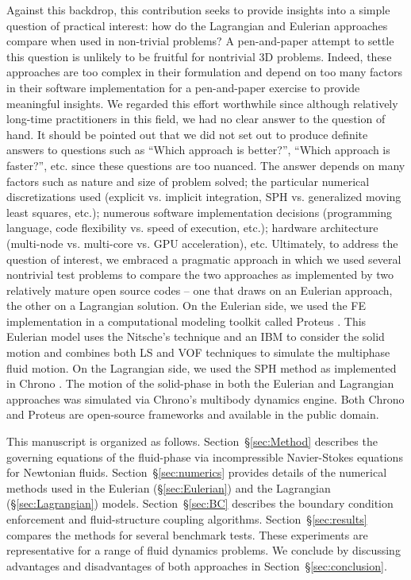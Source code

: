 \documentclass[final,3p,times]{elsarticle}
\begin{document}
Against this backdrop, this contribution seeks to provide insights into a simple question of practical interest: how do the Lagrangian and Eulerian approaches compare when used in non-trivial problems? A pen-and-paper attempt to settle this question is unlikely to be fruitful for nontrivial 3D problems. Indeed, these approaches are too complex in their formulation and depend on too many factors in their software implementation for a pen-and-paper exercise to provide meaningful insights. We regarded this effort worthwhile since although relatively long-time practitioners in this field, we had no clear answer to the question of hand. It should be pointed out that we did not set out to produce definite answers to questions such as ``Which approach is better?'', ``Which approach is faster?'', etc. since these questions are too nuanced. The answer depends on many factors such as nature and size of problem solved; the particular numerical discretizations used (explicit vs. implicit integration, SPH vs. generalized moving least squares, etc.); numerous software implementation decisions (programming language, code flexibility vs. speed of execution, etc.); hardware architecture (multi-node vs. multi-core vs. GPU acceleration), etc. Ultimately, to address the question of interest, we embraced a pragmatic approach in which we used several nontrivial test problems to compare the two approaches as implemented by two relatively mature open source codes -- one that draws on an Eulerian approach, the other on a Lagrangian solution. On the Eulerian side, we used the FE implementation in a computational modeling toolkit called Proteus \cite{proteus_1_6_1}. This Eulerian model uses the Nitsche's technique and an IBM to consider the solid motion and combines both LS and VOF techniques to simulate the multiphase fluid motion. On the Lagrangian side, we used the SPH method as implemented in Chrono \cite{projectChronoWebSite,chronoOverview2016}. 
The motion of the solid-phase in both the Eulerian and Lagrangian approaches was simulated via Chrono's multibody dynamics engine. Both Chrono and Proteus are open-source frameworks and available in the public domain.

This manuscript is organized as follows. Section~\S\ref{sec:Method} describes the governing equations of the fluid-phase via incompressible Navier-Stokes equations for Newtonian fluids. Section~\S\ref{sec:numerics} provides details of the numerical methods used in the Eulerian (\S\ref{sec:Eulerian}) and the Lagrangian (\S\ref{sec:Lagrangian}) models. Section~\S\ref{sec:BC} describes the boundary condition enforcement and fluid-structure coupling algorithms. Section~\S\ref{sec:results} compares the methods for several benchmark tests. These experiments are representative for a range of fluid dynamics problems. We conclude by discussing advantages and disadvantages of both approaches in Section~\S\ref{sec:conclusion}. 
\end{document}
